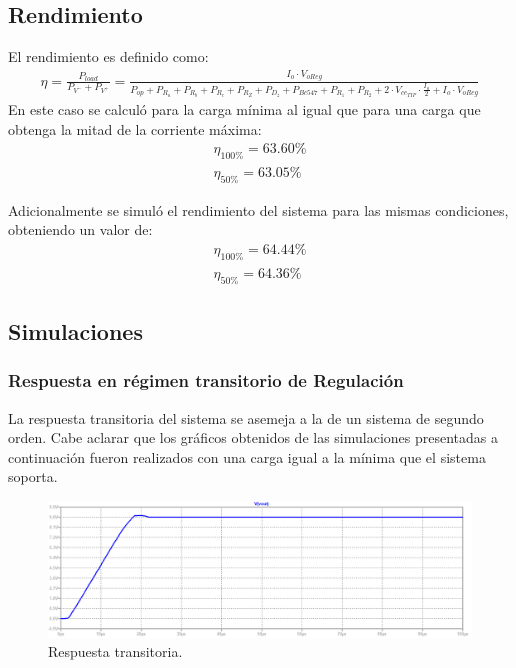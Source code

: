 \subsection{Rendimiento}
El rendimiento es definido como:
\begin{align}
	\eta = \frac{P_{load}}{P_{V^-}+P_{V^+}}=\frac{I_o \cdot V_{oReg}}{P_{op}+P_{R_a}+P_{R_b}+P_{R_c}+P_{R_Z}+P_{D_z}+P_{Bc547}+P_{R_1}+P_{R_2}+2\cdot V_{ce_{TIP}}\cdot \frac{I_o}{2}+I_o \cdot V_{oReg} }
\end{align}
En este caso se calculó para la carga mínima al igual que para una carga que obtenga la mitad de la corriente máxima:
\begin{equation}
\begin{aligned}
	\eta_{100\%} = 63.60\% \\ 
	\eta_{50\%} = 63.05\%
\end{aligned}
\end{equation}

Adicionalmente se simuló el rendimiento del sistema para las mismas condiciones, obteniendo un valor de:
\begin{equation}
\begin{aligned}
	\eta_{100\%} = 64.44\% \\ 
	\eta_{50\%} = 64.36\%
\end{aligned}
\end{equation}

\subsection{Simulaciones}

\subsubsection{Respuesta en régimen transitorio de Regulación}
La respuesta transitoria del sistema se asemeja a la de un sistema de segundo orden. Cabe aclarar que los gráficos obtenidos de las simulaciones presentadas a continuación fueron realizados con una carga igual a la mínima que el sistema soporta.
\begin{figure}[H]
\centering
	\includegraphics[width=1\textwidth]{ImagenesEjercicio2/transresp.png}
	\caption{Respuesta transitoria.}
	\label{fig:transitorioFuente}
\end{figure}

